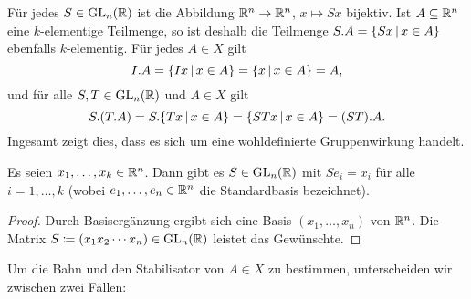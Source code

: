 \section{}





\addtocounter{subsection}{1}





\addtocounter{subsection}{1}





\addtocounter{subsection}{1}





\subsection{}

Für jedes $S \in \operatorname{GL}_{n}(\mathbb{R})$ ist die Abbildung $\mathbb{R}^n \to \mathbb{R}^n$, $x \mapsto Sx$ bijektiv.
Ist $A \subseteq \mathbb{R}^n$ eine $k$-elementige Teilmenge, so ist deshalb die Teilmenge $S.A = \{ Sx \suchthat x \in A\}$ ebenfalls $k$-elementig.
Für jedes $A \in X$ gilt
\[
    I.A
  = \{ Ix \suchthat x \in A \}
  = \{ x \suchthat x \in A \}
  = A,
\]
und für alle $S, T \in \operatorname{GL}_{n}(\mathbb{R})$ und $A \in X$ gilt
\[
    S.(T.A)
  = S.\{ Tx \suchthat x \in A \}
  = \{ STx \suchthat x \in A \}
  = (ST).A.
\]
Ingesamt zeigt dies, dass es sich um eine wohldefinierte Gruppenwirkung handelt.

\begin{lemma}
  \label{lemma: transitive on linear independent}
  Es seien $x_1, \dotsc, x_k \in \mathbb{R}^n$.
  Dann gibt es $S \in \operatorname{GL}_{n}(\mathbb{R})$ mit $Se_i = x_i$ für alle $i = 1, \dotsc, k$ \textup(wobei $e_1, \dotsc, e_n \in \mathbb{R}^n$ die Standardbasis bezeichnet\textup).
\end{lemma}

\begin{proof}
  Durch Basisergänzung ergibt sich eine Basis $(x_1, \dotsc, x_n)$ von $\mathbb{R}^n$.
  Die Matrix $S \coloneqq (x_1 x_2 \dotsb x_n) \in \operatorname{GL}_{n}(\mathbb{R})$ leistet das Gewünschte.
\end{proof}

Um die Bahn und den Stabilisator von $A \in X$ zu bestimmen, unterscheiden wir zwischen zwei Fällen:

